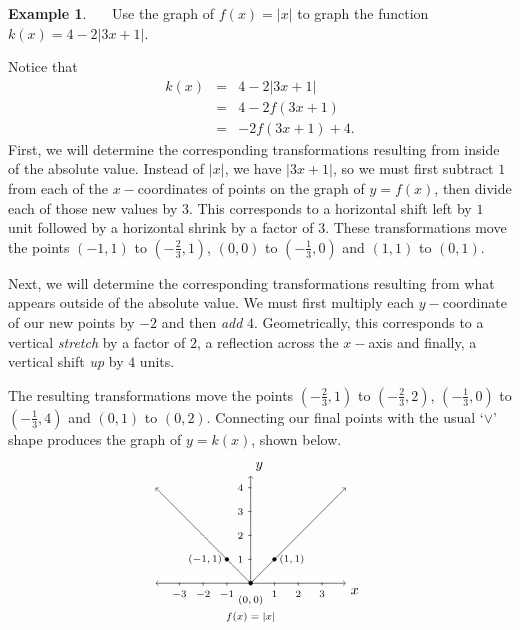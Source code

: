 \documentclass[12pt]{book}
\theoremstyle{definition}
\newtheorem{example}{Example}
\begin{document}
\begin{example}\label{absvalgraph}~~~Use the graph of $f(x) = |x|$ to graph the function $k(x) = 4-2|3x+1|$.\par
Notice that 
\begin{eqnarray*}
k(x) &=& 4-2|3x+1|\\
 &=&  4-2f(3x+1)\\
 &=& -2f(3x+1) + 4.
\end{eqnarray*}
First, we will determine the corresponding transformations resulting from inside of the absolute value.  Instead of $|x|$, we have $|3x+1|$, so we must first subtract $1$ from each of the $x-$coordinates of points on the graph of $y = f(x)$,  then divide each of those new values by $3$.  This corresponds to a horizontal shift left by $1$ unit followed by a horizontal shrink by a factor of $3$.  These transformations move the points $(-1,1)$ to $\left(-\frac{2}{3}, 1 \right)$, $(0,0)$ to $\left(-\frac{1}{3}, 0 \right)$ and $(1,1)$ to $\left(0,1\right)$.\par
Next, we will determine the corresponding transformations resulting from what appears outside of the absolute value.   We must first multiply each $y-$coordinate of our new points by $-2$ and then {\it add} $4$.  Geometrically, this corresponds to a vertical {\it stretch} by a factor of $2$, a reflection across the $x-$axis and finally, a vertical shift {\it up} by $4$ units.\par
The resulting transformations move the points $\left(-\frac{2}{3}, 1 \right)$ to $\left(-\frac{2}{3}, 2 \right)$, $\left(-\frac{1}{3}, 0 \right)$ to $\left(-\frac{1}{3}, 4 \right)$ and $\left(0,1\right)$ to $\left(0, 2\right)$.  Connecting our final points with the usual `$\vee$' shape produces the graph of $y = k(x)$, shown below.
\[ \begin{array}{ccc}
\begin{tikzpicture}[xscale=0.6,yscale=0.6]
	\draw [<->](-4,0) -- coordinate (x axis mid) (4,0) node[below right] {$x$};
	\draw [<->](0,0) -- coordinate (x axis mid) (0,4.5) node[above right] {$y$};
	\draw [->] plot [domain=0:4, samples=100] (\x,{\x});
	\draw [->] plot [domain=0:-4, samples=100] (\x,{-\x});
	\draw[fill] (-1,1) circle (0.08);
	\draw[fill] (1,1) circle (0.08);
	\draw[fill] (0,0) circle (0.08);
	\foreach \x in {-3,...,-1}
	\draw (\x,1pt) -- (\x,-3pt)
	node[anchor=north] {\scriptsize $\x$};
	\foreach \x in {1,...,3}
	\draw (\x,1pt) -- (\x,-3pt)
	node[anchor=north] {\scriptsize $\x$};
	\foreach \y in {1,...,4}
	\draw (1pt,\y) -- (-3pt,\y) 
	node[anchor=east] {\scriptsize $\y$};
	\draw (1,1) node[right] {\scriptsize $(1,1)$}; 
	\draw (-1,1) node[left] {\scriptsize $(-1,1)$}; 
	\draw (0,-0.3) node[below] {\scriptsize $(0,0)$}; 
	\draw (0,-1) node[below] {\scriptsize $f(x)=|x|$};  
\end{tikzpicture}


\end{array}\]
\end{example}
\end{document}
